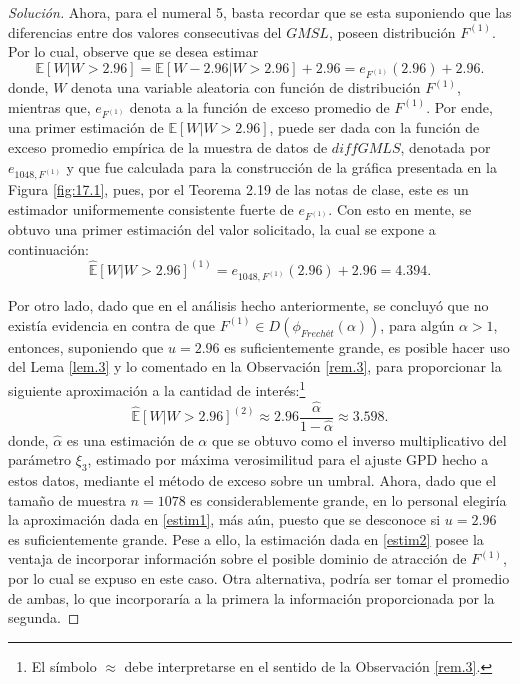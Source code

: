 \documentclass[10.5pt,notitlepage]{article}
\newenvironment{solucion}
  {\begin{proof}[Solución]}
  {\end{proof}}
\newcommand{\EE}{\mathbb{E}}
\theoremstyle{plain}
\begin{document}
\begin{solucion}
Ahora, para el numeral 5, basta recordar que se esta suponiendo que las diferencias entre dos valores consecutivas del \(GMSL\), poseen distribución \(F^{(1)} \). Por lo cual, observe que se desea estimar
\[
\EE[W| W > 2.96] = \EE[W- 2.96| W > 2.96] + 2.96 = e_{F^{(1)} }(2.96) + 2.96. 
\]
donde, \(W\) denota una variable aleatoria con función de distribución \(F^{(1)} \), mientras que, \(e_{F^{(1)} }\) denota a la función de exceso promedio de \(F^{(1)} \). Por ende, una primer estimación de \(\EE[W| W > 2.96]\), puede ser dada con la función de exceso promedio empírica de la muestra de datos de \(diffGMLS\), denotada por \(e_{1048,F^{(1)} }\) y que fue calculada para la construcción de la gráfica presentada en la Figura \ref{fig:17.1}, pues, por el Teorema 2.19 de las notas de clase, este es un estimador uniformemente consistente fuerte de \(e_{F^{(1)} }\). Con esto en mente, se obtuvo una primer estimación del valor solicitado, la cual se expone a continuación: 
\begin{equation}\label{estim1}
\hat{\EE}[W| W > 2.96]^{(1)} =e_{1048,F^{(1)} }(2.96) + 2.96 = 4.394.     
\end{equation}

Por otro lado, dado que en el análisis hecho anteriormente, se concluyó que no existía evidencia en contra de que \(F^{(1)} \in D(\phi_{Frechét}(\alpha))\), para algún \(\alpha > 1\), entonces, suponiendo que \(u = 2.96\) es suficientemente grande, es posible hacer uso del Lema \ref{lem.3} y lo comentado en la Observación \ref{rem.3}, para proporcionar la siguiente aproximación a la cantidad de interés:\footnote{El símbolo \(\approx\) debe interpretarse en el sentido de la Observación \ref{rem.3}.}
\begin{equation}\label{estim2}
\hat{\EE}[W| W > 2.96]^{(2)}  \approx 2.96\frac{\hat{\alpha}}{1 - \hat{\alpha}} \approx 3.598.    
\end{equation}
donde, \(\hat{\alpha}\) es una estimación de \(\alpha\) que se obtuvo como el inverso multiplicativo del parámetro \(\xi_3\), estimado por máxima verosimilitud para el ajuste GPD hecho a estos datos, mediante el método de exceso sobre un umbral. Ahora, dado que el tamaño de muestra \(n = 1078\) es considerablemente grande, en lo personal elegiría la aproximación dada en \eqref{estim1}, más aún, puesto que se desconoce si \(u = 2.96\) es suficientemente grande. Pese a ello, la estimación dada en \eqref{estim2} posee la ventaja de incorporar información sobre el posible dominio de atracción de \(F^{(1)}\), por lo cual se expuso en este caso. Otra alternativa, podría ser tomar el promedio de ambas, lo que incorporaría a la primera la información proporcionada por la segunda. 

\end{solucion}
\newpage
\end{document}
